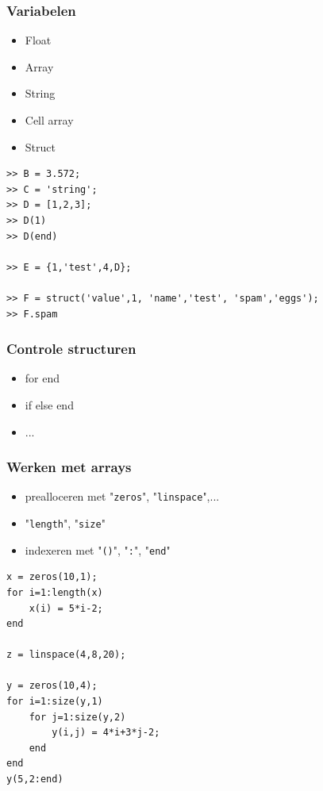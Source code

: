 \documentclass[t]{beamer}
\begin{document}
\begin{frame}[fragile]
	\frametitle{Variabelen}

	\begin{itemize}
		\item Float
		\item Array
		\item String
		\item Cell array
		\item Struct
	\end{itemize}
	
	\begin{lstlisting}
>> B = 3.572;
>> C = 'string';
>> D = [1,2,3];
>> D(1)
>> D(end)

>> E = {1,'test',4,D};

>> F = struct('value',1, 'name','test', 'spam','eggs');
>> F.spam
	\end{lstlisting}
	
\end{frame}
\begin{frame}
	\frametitle{Controle structuren}
	
	\begin{itemize}
		\item for  end
		\item if  else  end
		\item ...
	\end{itemize}
	
	\vspace{1cm}
		
	
\end{frame}
\begin{frame}[fragile]
	\frametitle{Werken met arrays}
	
	\begin{itemize}
		\item prealloceren met "\lstinline{zeros}", "\lstinline{linspace}",...
		\item "\lstinline{length}", "\lstinline{size}"
		\item indexeren met "\lstinline{()}", "\lstinline{:}", "\lstinline{end}"
	\end{itemize}
	
	\begin{lstlisting}
x = zeros(10,1);
for i=1:length(x)
    x(i) = 5*i-2;
end

z = linspace(4,8,20);

y = zeros(10,4);
for i=1:size(y,1)
	for j=1:size(y,2)
    	y(i,j) = 4*i+3*j-2;
    end
end
y(5,2:end)
	\end{lstlisting}
\end{frame}
\end{document}
